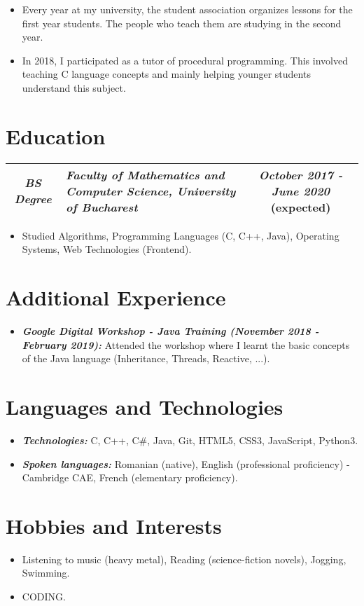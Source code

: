 \documentclass[11px]{article}
\begin{document}
        \begin{itemize}
            \item Every year at my university, the student association organizes lessons for the first year students. The people who teach them are studying in the second year.
            \item In 2018, I participated as a tutor of procedural programming. This involved teaching C language concepts and mainly helping younger students understand this subject.
        \end{itemize}
    
    \section*{Education}
        \begin{tabular} {cC{8cm}c}
            \small\textit{\textbf{BS Degree}} 
            & \small\textit{\textbf{Faculty of Mathematics and Computer Science, University of Bucharest}} 
            & \small\textit{\textbf{October 2017 - June 2020}} (expected)\\
            \hline
        \end{tabular}

        \begin{itemize}
            \item Studied Algorithms, Programming Languages (C, C++, Java), Operating Systems, Web Technologies (Frontend).
        \end{itemize}
    
    \section*{Additional Experience}
        \begin{itemize}
            \item \textbf{\textit{Google Digital Workshop - Java Training (November 2018 - February 2019):}} Attended the workshop where I learnt the basic concepts of the Java language (Inheritance, Threads, Reactive, ...). 
        \end{itemize}
    
    \section*{Languages and Technologies}
        \begin{itemize}
            \item \textbf{\textit{Technologies:}} C, C++, C\#, Java, Git, HTML5, CSS3, JavaScript, Python3.
            \item \textbf{\textit{Spoken languages:}} Romanian (native), English (professional proficiency) - Cambridge CAE, French (elementary proficiency).
        \end{itemize}
    
    \section*{Hobbies and Interests}
        \begin{itemize}
            \item Listening to music (heavy metal), Reading (science-fiction novels), Jogging, Swimming.
            \item CODING.
        \end{itemize}
\end{document}
